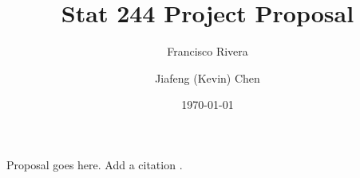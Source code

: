 \documentclass[a4paper]{article}
\begin{document}
\title{Stat 244 Project Proposal}
\author{Francisco Rivera \and Jiafeng (Kevin) Chen}
\date{\today}

\maketitle

Proposal goes here. Add a citation \citet{o1986automatic}.



\end{document}
